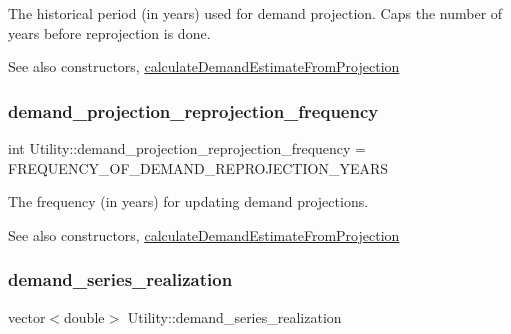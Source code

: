 The historical period (in years) used for demand projection. Caps the number of years before reprojection is done. 

\begin{DoxySeeAlso}{See also}
constructors, \mbox{\hyperlink{classUtility_a10f96b2f34ba7e6e12a8e8fb98b8534a}{calculate\+Demand\+Estimate\+From\+Projection}} 
\end{DoxySeeAlso}
\mbox{\label{classUtility_a1cfe05e6efb78a67e32e5849ee0918d5}} 
\subsubsection{\texorpdfstring{demand\+\_\+projection\+\_\+reprojection\+\_\+frequency}{demand\_projection\_reprojection\_frequency}}
{\footnotesize\ttfamily int Utility\+::demand\+\_\+projection\+\_\+reprojection\+\_\+frequency = F\+R\+E\+Q\+U\+E\+N\+C\+Y\+\_\+\+O\+F\+\_\+\+D\+E\+M\+A\+N\+D\+\_\+\+R\+E\+P\+R\+O\+J\+E\+C\+T\+I\+O\+N\+\_\+\+Y\+E\+A\+RS\hspace{0.3cm}{\ttfamily [private]}}



The frequency (in years) for updating demand projections. 

\begin{DoxySeeAlso}{See also}
constructors, \mbox{\hyperlink{classUtility_a10f96b2f34ba7e6e12a8e8fb98b8534a}{calculate\+Demand\+Estimate\+From\+Projection}} 
\end{DoxySeeAlso}
\mbox{\label{classUtility_a2f001332138af9aecd260ed1ad2348f4}} 
\subsubsection{\texorpdfstring{demand\+\_\+series\+\_\+realization}{demand\_series\_realization}}
{\footnotesize\ttfamily vector$<$double$>$ Utility\+::demand\+\_\+series\+\_\+realization\hspace{0.3cm}{\ttfamily [private]}}



